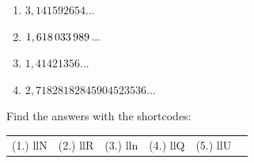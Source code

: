 \begin{enumerate}[noitemsep, label=\textbf{\arabic*}. ]
\label{m38349*id326443}\begin{enumerate}[noitemsep, label=\textbf{\alph*}. ] 
            \label{m38349*uid45}\item \begin{math}3,141592654...\end{math}\label{m38349*uid46}\item \begin{math}1,618\phantom{\rule{0.166667em}{0ex}}033\phantom{\rule{0.166667em}{0ex}}989\phantom{\rule{0.166667em}{0ex}}...\end{math}\label{m38349*uid47}\item \begin{math}1,41421356...\end{math}\label{m38349*uid48}\item \begin{math}2,71828182845904523536...\end{math}\end{enumerate}
        \end{enumerate}
  \label{m38349**end}
\par {} Find the answers with the shortcodes:
 \par \begin{tabular}[h]{cccccc}
 (1.) llN  &  (2.) llR  &  (3.) lln  &  (4.) llQ  &  (5.) llU  & \end{tabular}
